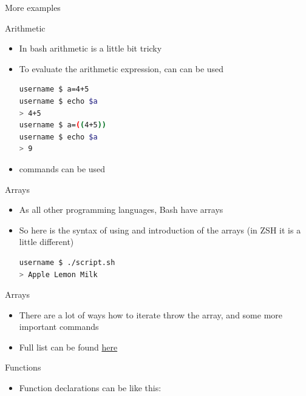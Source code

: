 \documentclass[usenames,dvipsnames,10pt,aspectratio=169]{beamer}
\begin{document}
\begin{frame}{More  examples}
    
\end{frame}

\begin{frame}[fragile]{Arithmetic}
    \begin{itemize}
        \item In bash arithmetic is a little bit tricky
        \item To evaluate the arithmetic expression,  can can be used
        \begin{lstlisting}[language=Bash, style=shellstyle]
username $ a=4+5
username $ echo $a
> 4+5
username $ a=((4+5))
username $ echo $a
> 9 \end{lstlisting}
        \item {} commands can be used 
    \end{itemize}
\end{frame}

\begin{frame}[fragile]{Arrays}
    \begin{itemize}
        \item As all other programming languages, Bash have arrays
        \item So here is the syntax of using and introduction of the arrays (in ZSH it is a little different)
        
        \begin{lstlisting}[language=Bash, style=shellstyle]
username $ ./script.sh
> Apple Lemon Milk
        \end{lstlisting}
    \end{itemize}
\end{frame}

\begin{frame}[fragile]{Arrays}
    \begin{itemize}
        \item There are a lot of ways how to iterate throw the array, and some more important commands
        
        \item Full list can be found \href{https://devhints.io/bash#arrays}{here}
    \end{itemize}
\end{frame}

\begin{frame}[fragile]{Functions}
    \begin{itemize}
        \item Function declarations can be like this:
        
    \end{itemize}
\end{frame}
\end{document}
